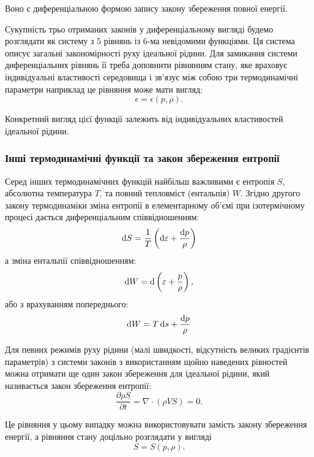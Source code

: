 Воно є диференціальною формою запису закону збереження повної енергії. \medskip

Сукупність трьо отриманих законів у диференціальному вигляді будемо розглядати як систему з 5 рівнянь із 6-ма невідомими функціями. Ця система описує загальні закономірності руху ідеальної рідини. Для замикання системи диференціальних рівнянь її треба доповнити рівнянням стану, яке враховує індивідуальні властивості середовища і зв'язує між собою три термодинамічні параметри наприклад це рівняння може мати вигляд:
\begin{equation}
	\epsilon = \epsilon(p, \rho).
\end{equation}

Конкретний вигляд цієї функції залежить від індивідуальних властивостей ідеальної рідини. 

\subsubsection{Інші термодинамічні функції та закон збереження ентропії}

Серед інших термодинамічних функцій найбільш важливими є ентропія $S$, абсолютна температура $T$, та повний тепловміст (ентальпія) $W$. Згідно другого закону термодинаміки зміна ентропії в елементарному об'ємі при ізотермічному процесі дається диференціальним співвідношенням:
\begin{equation}
	\mathop{}\!\mathrm{d} S = \frac{1}{T} \left( \mathop{}\!\mathrm{d} \varepsilon + \frac{\mathop{}\!\mathrm{d} p}{\rho} \right)
\end{equation}
а зміна ентальпії співвідношенням:
\begin{equation}
	\mathop{}\!\mathrm{d} W = \mathop{}\!\mathrm{d} \left( \varepsilon + \frac{p}{\rho} \right),
\end{equation}
або з врахуванням попереднього:
\begin{equation}
	\mathop{}\!\mathrm{d} W = T \mathop{}\!\mathrm{d} s + \frac{\mathop{}\!\mathrm{d} p}{\rho}
\end{equation}

Для певних режимів руху рідини (малі швидкості, відсутність великих градієнтів параметрів) з системи законів з використанням щойно наведених рівностей можна отримати ще один закон збереження для ідеальної рідини, який називається закон збереження ентропії:
\begin{equation}
	\frac{\partial \rho S}{\partial t} = \nabla \cdot (\rho V S) = 0.
\end{equation}

Це рівняння у цьому випадку можна використовувати замість закону збереження енергії, а рівняння стану доцільно розглядати у вигляді
\begin{equation}
	S = S(p, \rho).
\end{equation}

